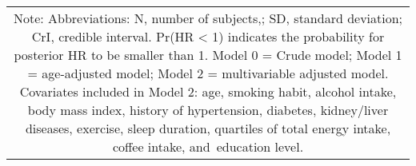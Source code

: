 \documentclass[nutrients,article,accept,moreauthors,pdftex]{Definitions/mdpi}
\begin{document}
\begin{table}[H]
{\begin{tabular}{L{32mm}C{8mm}C{26mm}C{25mm}C{25mm}C{20mm}}
\end{tabular}}\\


\begin{tabular}{@{}c@{}} 
\multicolumn{1}{p{\textwidth -.88in}}{\footnotesize Note: Abbreviations: N, number of subjects,; SD, standard deviation; CrI, credible interval. Pr(HR < 1) indicates the probability for posterior HR to be smaller than 1. Model 0 = Crude model; Model 1 = age-adjusted model; Model 2 = multivariable adjusted model. Covariates included in Model 2: age, smoking habit, alcohol intake, body mass index, history of hypertension, diabetes, kidney/liver diseases, exercise, sleep duration,  quartiles of total energy intake, coffee intake, and~education level.}
\end{tabular}


\end{table}
\unskip
\end{document}
